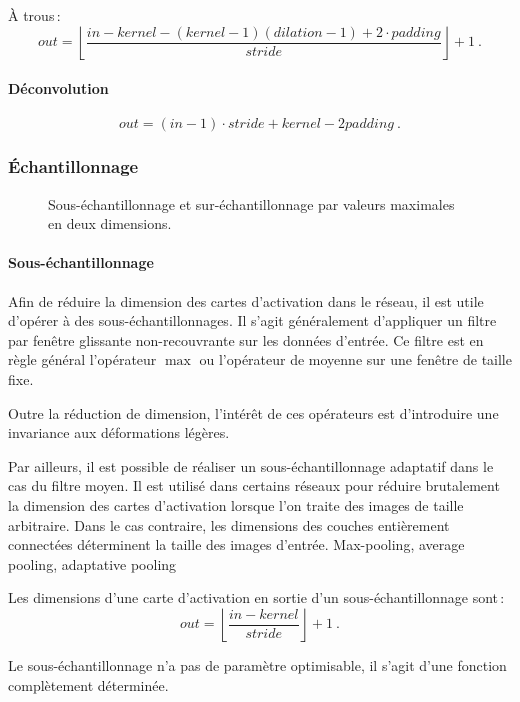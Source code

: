 À trous\,:
$$out = \left\lfloor \frac{in - kernel - (kernel -1)(dilation - 1) + 2\cdot{}padding}{stride}\right\rfloor + 1~.$$


\paragraph{Déconvolution}

$$out = (in - 1) \cdot stride + kernel - 2padding~.$$

\subsubsection{Échantillonnage}

\begin{figure}
  \resizebox{\textwidth}{!}{
  
  }
  \caption{Sous-échantillonnage et sur-échantillonnage par valeurs maximales en deux dimensions.}
  \label{fig:pooling}
\end{figure}

\paragraph{Sous-échantillonnage}

Afin de réduire la dimension des cartes d'activation dans le réseau, il est utile d'opérer à des sous-échantillonnages. Il s'agit généralement d'appliquer un filtre par fenêtre glissante non-recouvrante sur les données d'entrée. Ce filtre est en règle général l'opérateur $\max$ ou l'opérateur de moyenne sur une fenêtre de taille fixe.

Outre la réduction de dimension, l'intérêt de ces opérateurs est d'introduire une invariance aux déformations légères.

Par ailleurs, il est possible de réaliser un sous-échantillonnage adaptatif dans le cas du filtre moyen. Il est utilisé dans certains réseaux pour réduire brutalement la dimension des cartes d'activation lorsque l'on traite des images de taille arbitraire. Dans le cas contraire, les dimensions des couches entièrement connectées déterminent la taille des images d'entrée.
Max-pooling, average pooling, adaptative pooling

Les dimensions d'une carte d'activation en sortie d'un sous-échantillonnage sont\,:
$$out = \left\lfloor \frac{in - kernel}{stride}\right\rfloor + 1~.$$

Le sous-échantillonnage n'a pas de paramètre optimisable, il s'agit d'une fonction complètement déterminée.

